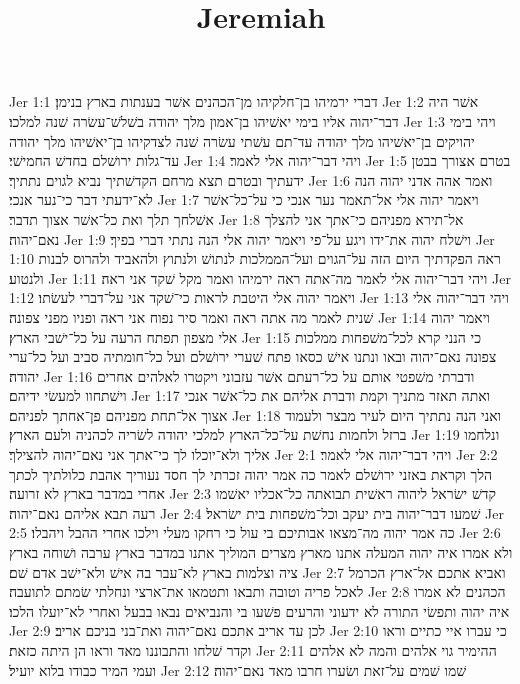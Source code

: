

\title{Jeremiah}

Jer 1:1  דברי ירמיהו בן־חלקיהו מן־הכהנים אשׁר בענתות בארץ בנימן׃
Jer 1:2  אשׁר היה דבר־יהוה אליו בימי יאשׁיהו בן־אמון מלך יהודה בשׁלשׁ־עשׂרה שׁנה למלכו׃
Jer 1:3  ויהי בימי יהויקים בן־יאשׁיהו מלך יהודה עד־תם עשׁתי עשׂרה שׁנה לצדקיהו בן־יאשׁיהו מלך יהודה עד־גלות ירושׁלם בחדשׁ החמישׁי׃
Jer 1:4  ויהי דבר־יהוה אלי לאמר׃
Jer 1:5  בטרם אצורך בבטן ידעתיך ובטרם תצא מרחם הקדשׁתיך נביא לגוים נתתיך׃
Jer 1:6  ואמר אהה אדני יהוה הנה לא־ידעתי דבר כי־נער אנכי׃
Jer 1:7  ויאמר יהוה אלי אל־תאמר נער אנכי כי על־כל־אשׁר אשׁלחך תלך ואת כל־אשׁר אצוך תדבר׃
Jer 1:8  אל־תירא מפניהם כי־אתך אני להצלך נאם־יהוה׃
Jer 1:9  וישׁלח יהוה את־ידו ויגע על־פי ויאמר יהוה אלי הנה נתתי דברי בפיך׃
Jer 1:10  ראה הפקדתיך היום הזה על־הגוים ועל־הממלכות לנתושׁ ולנתוץ ולהאביד ולהרוס לבנות ולנטוע׃
Jer 1:11  ויהי דבר־יהוה אלי לאמר מה־אתה ראה ירמיהו ואמר מקל שׁקד אני ראה׃
Jer 1:12  ויאמר יהוה אלי היטבת לראות כי־שׁקד אני על־דברי לעשׂתו׃
Jer 1:13  ויהי דבר־יהוה אלי שׁנית לאמר מה אתה ראה ואמר סיר נפוח אני ראה ופניו מפני צפונה׃
Jer 1:14  ויאמר יהוה אלי מצפון תפתח הרעה על כל־ישׁבי הארץ׃
Jer 1:15  כי הנני קרא לכל־משׁפחות ממלכות צפונה נאם־יהוה ובאו ונתנו אישׁ כסאו פתח שׁערי ירושׁלם ועל כל־חומתיה סביב ועל כל־ערי יהודה׃
Jer 1:16  ודברתי משׁפטי אותם על כל־רעתם אשׁר עזבוני ויקטרו לאלהים אחרים וישׁתחוו למעשׂי ידיהם׃
Jer 1:17  ואתה תאזר מתניך וקמת ודברת אליהם את כל־אשׁר אנכי אצוך אל־תחת מפניהם פן־אחתך לפניהם׃
Jer 1:18  ואני הנה נתתיך היום לעיר מבצר ולעמוד ברזל ולחמות נחשׁת על־כל־הארץ למלכי יהודה לשׂריה לכהניה ולעם הארץ׃
Jer 1:19  ונלחמו אליך ולא־יוכלו לך כי־אתך אני נאם־יהוה להצילך׃
Jer 2:1  ויהי דבר־יהוה אלי לאמר׃
Jer 2:2  הלך וקראת באזני ירושׁלם לאמר כה אמר יהוה זכרתי לך חסד נעוריך אהבת כלולתיך לכתך אחרי במדבר בארץ לא זרועה׃
Jer 2:3  קדשׁ ישׂראל ליהוה ראשׁית תבואתה כל־אכליו יאשׁמו רעה תבא אליהם נאם־יהוה׃
Jer 2:4  שׁמעו דבר־יהוה בית יעקב וכל־משׁפחות בית ישׂראל׃
Jer 2:5  כה אמר יהוה מה־מצאו אבותיכם בי עול כי רחקו מעלי וילכו אחרי ההבל ויהבלו׃
Jer 2:6  ולא אמרו איה יהוה המעלה אתנו מארץ מצרים המוליך אתנו במדבר בארץ ערבה ושׁוחה בארץ ציה וצלמות בארץ לא־עבר בה אישׁ ולא־ישׁב אדם שׁם׃
Jer 2:7  ואביא אתכם אל־ארץ הכרמל לאכל פריה וטובה ותבאו ותטמאו את־ארצי ונחלתי שׂמתם לתועבה׃
Jer 2:8  הכהנים לא אמרו איה יהוה ותפשׂי התורה לא ידעוני והרעים פשׁעו בי והנביאים נבאו בבעל ואחרי לא־יועלו הלכו׃
Jer 2:9  לכן עד אריב אתכם נאם־יהוה ואת־בני בניכם אריב׃
Jer 2:10  כי עברו איי כתיים וראו וקדר שׁלחו והתבוננו מאד וראו הן היתה כזאת׃
Jer 2:11  ההימיר גוי אלהים והמה לא אלהים ועמי המיר כבודו בלוא יועיל׃
Jer 2:12  שׁמו שׁמים על־זאת ושׂערו חרבו מאד נאם־יהוה׃
